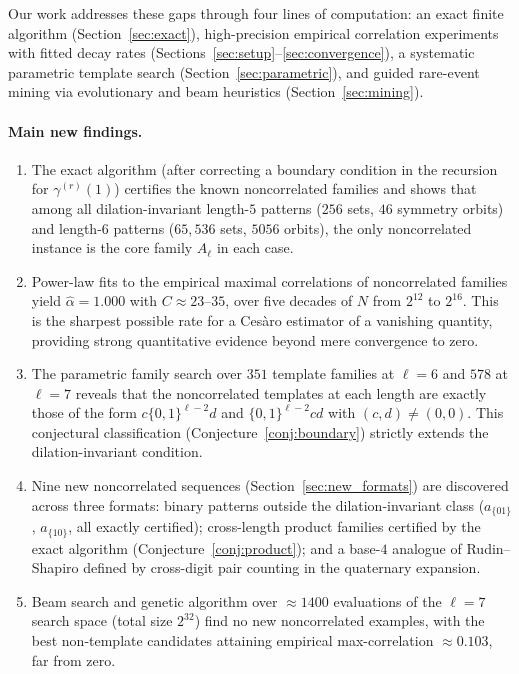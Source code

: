 \documentclass[11pt]{article}
\theoremstyle{definition}
\begin{document}
Our work addresses these gaps through four lines of computation:
an exact finite algorithm (Section~\ref{sec:exact}),
high-precision empirical correlation experiments with fitted decay
rates (Sections~\ref{sec:setup}--\ref{sec:convergence}),
a systematic parametric template search (Section~\ref{sec:parametric}),
and guided rare-event mining via evolutionary and beam heuristics
(Section~\ref{sec:mining}).

\paragraph{Main new findings.}
\begin{enumerate}[leftmargin=*]
\item The exact algorithm (after correcting a boundary condition in
      the recursion for $\gamma^{(r)}(1)$) certifies the known
      noncorrelated families and shows that among all dilation-invariant
      length-$5$ patterns ($256$ sets, $46$ symmetry orbits) and
      length-$6$ patterns ($65{,}536$ sets, $5056$ orbits), the only
      noncorrelated instance is the core family $A_\ell$ in each case.

\item Power-law fits to the empirical maximal correlations of
      noncorrelated families yield $\hat\alpha = 1.000$ with $C \approx
      23$--$35$, over five decades of $N$ from $2^{12}$ to $2^{16}$.
      This is the sharpest possible rate for a Ces\`{a}ro estimator of a
      vanishing quantity, providing strong quantitative evidence beyond
      mere convergence to zero.

\item The parametric family search over $351$ template families at
      $\ell = 6$ and $578$ at $\ell = 7$ reveals that the noncorrelated
      templates at each length are exactly those of the form
      $c\{0,1\}^{\ell-2}d$ and $\{0,1\}^{\ell-2}cd$ with
      $(c,d) \neq (0,0)$.  This conjectural classification
      (Conjecture~\ref{conj:boundary}) strictly extends the
      dilation-invariant condition.

\item Nine new noncorrelated sequences (Section~\ref{sec:new_formats})
      are discovered across three formats: binary patterns outside the
      dilation-invariant class ($a_{\{01\}}$, $a_{\{10\}}$, all
      exactly certified); cross-length product families certified by the
      exact algorithm (Conjecture~\ref{conj:product}); and a base-$4$
      analogue of Rudin--Shapiro defined by cross-digit pair counting
      in the quaternary expansion.

\item Beam search and genetic algorithm over $\approx 1400$ evaluations
      of the $\ell = 7$ search space (total size $2^{32}$) find no new
      noncorrelated examples, with the best non-template candidates
      attaining empirical max-correlation $\approx 0.103$, far from zero.
\end{enumerate}
\end{document}
